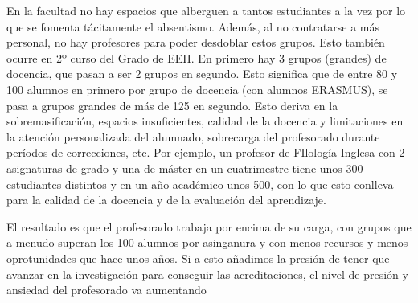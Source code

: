 \begin{itemize}[leftmargin=*, labelsep=0.6em, itemsep=0.8em]
{{{{{{{En la facultad no hay espacios que alberguen a tantos estudiantes a la vez por lo que se fomenta tácitamente el absentismo. Además, al no contratarse a más personal, no hay profesores para poder desdoblar estos grupos. Esto también ocurre en 2º curso del Grado de EEII. En primero hay 3 grupos (grandes) de docencia, que pasan a ser 2 grupos en segundo. Esto significa que de entre 80 y 100 alumnos en primero por grupo de docencia (con alumnos ERASMUS), se pasa a grupos grandes de más de 125 en segundo. Esto deriva en la sobremasificación, espacios insuficientes, calidad de la docencia y limitaciones en la atención personalizada del alumnado, sobrecarga del profesorado durante períodos de correcciones, etc. Por ejemplo, un profesor de FIlología Inglesa con 2 asignaturas de grado y una de máster en un cuatrimestre tiene unos 300 estudiantes distintos y en un año académico unos 500, con lo que esto conlleva para la calidad de la docencia y de la evaluación del aprendizaje.

El resultado es que el profesorado trabaja por encima de su carga, con grupos que a menudo superan los 100 alumnos por asinganura y con menos recursos y menos oprotunidades que hace unos años. Si a esto añadimos la presión de tener que avanzar en la investigación para conseguir las acreditaciones, el nivel de presión y ansiedad del profesorado va aumentando}



}}}}}}
\end{itemize}
